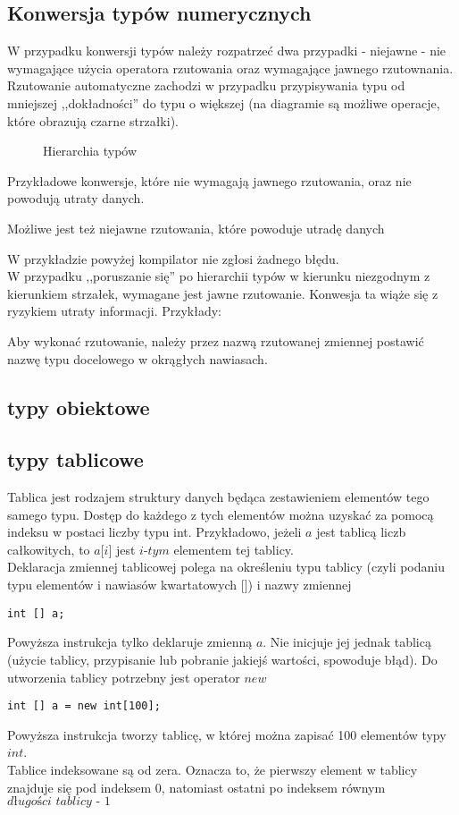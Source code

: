 \documentclass[11pt]{article}
\begin{document}
\subsection{Konwersja typów numerycznych}
W przypadku konwersji typów należy rozpatrzeć dwa przypadki - niejawne - nie wymagające użycia operatora rzutowania oraz wymagające jawnego rzutownania.
Rzutowanie automatyczne zachodzi w przypadku przypisywania typu od mniejszej ,,dokładności'' do typu o większej (na diagramie są możliwe operacje, które obrazują czarne strzałki). 
\begin{figure}
\centering
\caption{Hierarchia typów}
\end{figure}
Przykładowe konwersje, które nie wymagają jawnego rzutowania, oraz nie powodują utraty danych.

Możliwe jest też niejawne rzutowania, które powoduje utradę danych

W przykładzie powyżej kompilator nie zgłosi żadnego błędu.\\

W przypadku ,,poruszanie się'' po hierarchii typów w kierunku niezgodnym z kierunkiem strzałek, wymagane jest jawne rzutowanie. Konwesja ta wiąże się z ryzykiem utraty informacji. Przykłady:  

Aby wykonać rzutowanie, należy przez nazwą rzutowanej zmiennej postawić nazwę typu docelowego w okrągłych nawiasach.
\subsection{typy obiektowe}
\subsection{typy tablicowe} 
Tablica jest rodzajem struktury danych będąca zestawieniem elementów tego samego typu. Dostęp do każdego z tych elementów można uzyskać za pomocą indeksu w postaci liczby typu int. Przykładowo, jeżeli $\textit{a}$ jest tablicą liczb całkowitych, to $\textit{a[i]}$ jest $\textit{i-tym}$ elementem tej tablicy.\\
Deklaracja zmiennej tablicowej polega na określeniu typu tablicy (czyli podaniu typu elementów i nawiasów kwartatowych $\textit{[]}$) i nazwy zmiennej
\begin{lstlisting}
int [] a;
\end{lstlisting}
Powyższa instrukcja tylko deklaruje zmienną $\textit{a}$. Nie inicjuje jej jednak tablicą (użycie tablicy, przypisanie lub pobranie jakiejś wartości, spowoduje błąd). Do utworzenia tablicy potrzebny jest operator $\textit{new}$
\begin{lstlisting}
int [] a = new int[100];
\end{lstlisting}
Powyższa instrukcja tworzy tablicę, w której można zapisać 100 elementów typy $\textit{int}$.\\
Tablice indeksowane są od zera. Oznacza to, że pierwszy element w tablicy znajduje się pod indeksem 0, natomiast ostatni po indeksem równym $\textit{długości tablicy - 1}$
\end{document}
